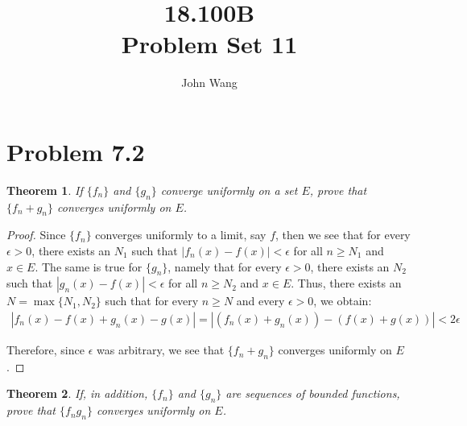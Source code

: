 \documentclass[psamsfonts]{amsart}
\title{18.100B\\
Problem Set 11}
\author{John Wang}
\newtheorem{thm}{Theorem}[section]
\theoremstyle{definition}
\theoremstyle{remark}
\numberwithin{equation}{section}
\begin{document}
\maketitle

\section{Problem 7.2}

\begin{thm}
If $\{f_n \}$ and $\{ g_n \}$ converge uniformly on a set $E$, prove that $\{ f_n + g_n \}$ converges uniformly on $E$.
\end{thm}

\begin{proof}
Since $\{ f_n \}$ converges uniformly to a limit, say $f$, then we see that for every $\epsilon > 0$, there exists an $N_1$ such that $|f_n(x) - f(x) | < \epsilon$ for all $n \geq N_1$ and $x \in E$. The same is true for $\{g_n \}$, namely that for every $\epsilon > 0$, there exists an $N_2$ such that $|g_n(x) - f(x) | < \epsilon$ for all $n \geq N_2$ and $x \in E$. Thus, there exists an $N = \max\{N_1, N_2 \}$ such that for every $n \geq N$ and every $\epsilon > 0$, we obtain:
\begin{eqnarray}
|f_n(x) - f(x) + g_n(x) - g(x)| = |(f_n(x) + g_n(x)) - (f(x) + g(x)) | < 2 \epsilon
\end{eqnarray}

Therefore, since $\epsilon$ was arbitrary, we see that $\{ f_n + g_n \}$ converges uniformly on $E$.
\end{proof}

\begin{thm}
If, in addition, $\{ f_n \}$ and $\{ g_n \}$ are sequences of bounded functions, prove that $\{ f_n g_n \}$ converges uniformly on $E$.
\end{thm}
\end{document}
